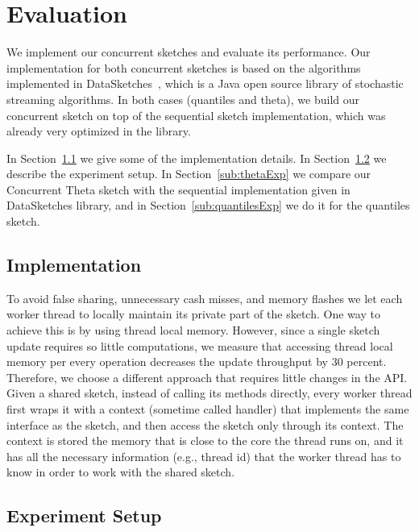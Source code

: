 \section{Evaluation}
\label{sec:evaluation}




We implement our concurrent sketches and evaluate its
performance.
Our implementation for both concurrent sketches is based on the
algorithms implemented in DataSketches~\cite{}, which is a Java
open source library of stochastic streaming algorithms.
In both cases (quantiles and theta), we build our concurrent
sketch on top of the sequential sketch implementation, which was
already very optimized in the library.

In Section~\ref{sub:imp} we give some of the implementation
details.
In Section~\ref{sub:setup} we describe the experiment setup.
In Section~\ref{sub:thetaExp} we compare our Concurrent Theta
sketch with the sequential implementation given in
DataSketches library, and in Section~\ref{sub:quantilesExp} we do
it for the quantiles sketch. 


\subsection{Implementation}
\label{sub:imp}

To avoid false sharing, unnecessary cash misses, and memory
flashes we let each worker thread to locally maintain its private
part of the sketch.
One way to achieve this is by using thread local memory.
However, since a single sketch update requires so little
computations, we measure that accessing thread local memory per
every operation decreases the update throughput by 30 percent.
Therefore, we choose a different approach that requires little
changes in the API.
Given a shared sketch, instead of calling its methods
directly, every worker thread first wraps it with a context
(sometime called handler) that implements the same interface as
the sketch, and then access the sketch only through its context.
The context is stored the memory that is close to the core
the thread runs on, and it has all the necessary information
(e.g., thread id) that the worker thread has to know in order to 
work with the shared sketch.

  

\subsection{Experiment Setup}
\label{sub:setup}

